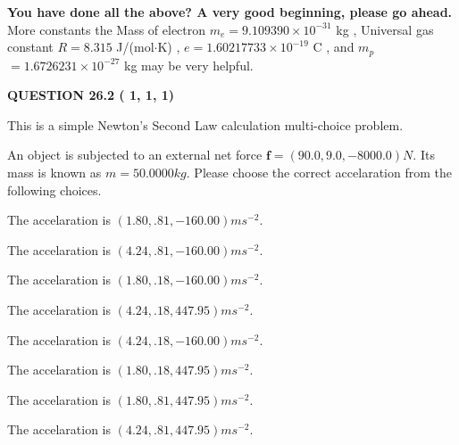 \documentclass[12pt]{article}
\begin{document}
   
\vspace{0.3in}
{\textbf{\LARGE{You have done all the above? A very good beginning, please go ahead.}}}
More constants the
Mass of electron
$m_e$$ =
9.109390 \times 10^{-31} $
kg
,
Universal gas constant
$R$$ =
8.315 $
J/(mol$\cdot $K)
,
$e$$ =
1.60217733 \times 10^{-19} $
C
, and
$m_p$$ =
1.6726231 \times 10^{-27} $
kg
%
may be very helpful.
\vspace{0.3in}
   
   
  
\vspace{0.2in}
  
{\textbf{\Large{QUESTION
26.2 
 (          1,          1,          1)
}}}
  
  


\noindent{}
This is a simple Newton's Second Law calculation multi-choice problem.  
\noindent{}


 
 
An object is subjected to an external net force $\mathbf{f}=
(90.0 , 9.0 , -8000.0) N$.
Its mass is known as $m= %
50.0000 kg$. Please choose the
correct accelaration from the following choices.
 
 
 
The accelaration is $  %
(
1.80,
.81,
-160.00)
ms^{-2} $.
 
 
The accelaration is $  %
(
4.24,
.81,
-160.00)
ms^{-2} $.
 
 
The accelaration is $  %
(
1.80,
.18,
-160.00)
ms^{-2} $.
 
 
The accelaration is $  %
(
4.24,
.18,
447.95)
ms^{-2} $.
 
 
The accelaration is $  %
(
4.24,
.18,
-160.00)
ms^{-2} $.
 
 
The accelaration is $  %
(
1.80,
.18,
447.95)
ms^{-2} $.
 
 
The accelaration is $  %
(
1.80,
.81,
447.95)
ms^{-2} $.
 
 
The accelaration is $  %
(
4.24,
.81,
447.95)
ms^{-2} $.
 
 
\noindent{}
 
\end{document}
